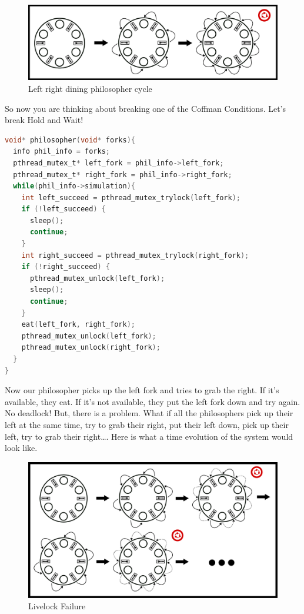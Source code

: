 \begin{figure}[H]
\centering
\includegraphics[width=.9\textwidth]{deadlock/drawings/dining_naive.eps}
\caption{Left right dining philosopher cycle}
\end{figure}


So now you are thinking about breaking one of the Coffman Conditions.
Let's break Hold and Wait!

\begin{lstlisting}[language=C]
void* philosopher(void* forks){
  info phil_info = forks;
  pthread_mutex_t* left_fork = phil_info->left_fork;
  pthread_mutex_t* right_fork = phil_info->right_fork;
  while(phil_info->simulation){
    int left_succeed = pthread_mutex_trylock(left_fork);
    if (!left_succeed) {
      sleep();
      continue;
    }
    int right_succeed = pthread_mutex_trylock(right_fork);
    if (!right_succeed) {
      pthread_mutex_unlock(left_fork);
      sleep();
      continue;
    }
    eat(left_fork, right_fork);
    pthread_mutex_unlock(left_fork);
    pthread_mutex_unlock(right_fork);
  }
}
\end{lstlisting}

Now our philosopher picks up the left fork and tries to grab the right.
If it's available, they eat.
If it's not available, they put the left fork down and try again.
No deadlock! But, there is a problem.
What if all the philosophers pick up their left at the same time, try to grab their right, put their left down, pick up their left, try to grab their right\ldots{}.
Here is what a time evolution of the system would look like.

\begin{figure}[H]
\centering
\includegraphics[width=.9\textwidth]{deadlock/drawings/dining_livelock.eps}
\caption{Livelock Failure}
\end{figure}

